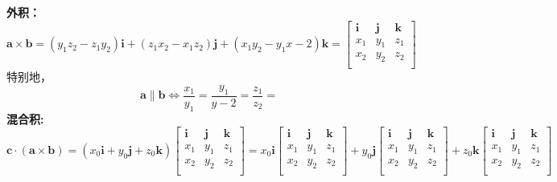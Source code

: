 \noindent \textbf{外积：}$\boldsymbol{a}\times\boldsymbol{b}=(y_1z_2-z_1y_2)\boldsymbol{i}+(z_1x_2-x_1z_2)\boldsymbol{j}+(x_1y_2-y_1x-2)\boldsymbol{k}=
	\begin{bmatrix}
		\boldsymbol{i} & \boldsymbol{j} & \boldsymbol{k}\\
		x_1 & y_1 & z_1\\
		x_2 & y_2 & z_2\\
	\end{bmatrix}$\\
特别地，
\begin{equation}
	\boldsymbol{a}\parallel\boldsymbol{b}\Leftrightarrow \frac{x_1}{y_1}=\frac{y_1}{y-2}=\frac{z_1}{z_2}=
\end{equation}
\textbf{混合积:}
\begin{equation}
	\nonumber
	\boldsymbol{c}\cdot(\boldsymbol{a}\times\boldsymbol{b})=(x_0\boldsymbol{i}+y_0\boldsymbol{j}+z_0\boldsymbol{k})	
	\begin{bmatrix}
		\boldsymbol{i} & \boldsymbol{j} & \boldsymbol{k}\\
		x_1 & y_1 & z_1\\
		x_2 & y_2 & z_2\\
	\end{bmatrix}=x_0\boldsymbol{i}
	\begin{bmatrix}
	\boldsymbol{i} & \boldsymbol{j} & \boldsymbol{k}\\
	x_1 & y_1 & z_1\\
	x_2 & y_2 & z_2\\
\end{bmatrix}+y_0\boldsymbol{j}	
\begin{bmatrix}
\boldsymbol{i} & \boldsymbol{j} & \boldsymbol{k}\\
x_1 & y_1 & z_1\\
x_2 & y_2 & z_2\\
\end{bmatrix}+z_0\boldsymbol{k}	
\begin{bmatrix}
\boldsymbol{i} & \boldsymbol{j} & \boldsymbol{k}\\
x_1 & y_1 & z_1\\
x_2 & y_2 & z_2\\
\end{bmatrix}
\end{equation}
